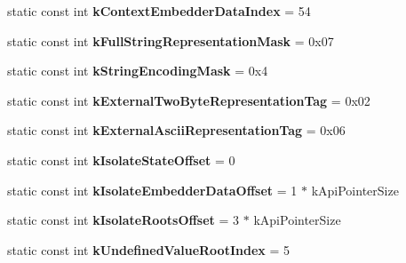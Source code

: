 \begin{DoxyCompactItemize}
\item 
\hypertarget{classv8_1_1internal_1_1_internals_afb65846499ec5f68172e4b2e8301a493}{}static const int {\bfseries k\+Context\+Embedder\+Data\+Index} = 54\label{classv8_1_1internal_1_1_internals_afb65846499ec5f68172e4b2e8301a493}

\item 
\hypertarget{classv8_1_1internal_1_1_internals_a5c39a86b30463928ea719def66916507}{}static const int {\bfseries k\+Full\+String\+Representation\+Mask} = 0x07\label{classv8_1_1internal_1_1_internals_a5c39a86b30463928ea719def66916507}

\item 
\hypertarget{classv8_1_1internal_1_1_internals_a1927ac3def13a57e03025e62ca46d1c5}{}static const int {\bfseries k\+String\+Encoding\+Mask} = 0x4\label{classv8_1_1internal_1_1_internals_a1927ac3def13a57e03025e62ca46d1c5}

\item 
\hypertarget{classv8_1_1internal_1_1_internals_a73faf917416d2519b65c7255e77a74ce}{}static const int {\bfseries k\+External\+Two\+Byte\+Representation\+Tag} = 0x02\label{classv8_1_1internal_1_1_internals_a73faf917416d2519b65c7255e77a74ce}

\item 
\hypertarget{classv8_1_1internal_1_1_internals_adea2f5a76d07821f7fa885a8dcda0eec}{}static const int {\bfseries k\+External\+Ascii\+Representation\+Tag} = 0x06\label{classv8_1_1internal_1_1_internals_adea2f5a76d07821f7fa885a8dcda0eec}

\item 
\hypertarget{classv8_1_1internal_1_1_internals_af591f991ecb24f9f6b33209e33b0d9ef}{}static const int {\bfseries k\+Isolate\+State\+Offset} = 0\label{classv8_1_1internal_1_1_internals_af591f991ecb24f9f6b33209e33b0d9ef}

\item 
\hypertarget{classv8_1_1internal_1_1_internals_ad722bf4760df09958cd1062db4a5524c}{}static const int {\bfseries k\+Isolate\+Embedder\+Data\+Offset} = 1 $\ast$ k\+Api\+Pointer\+Size\label{classv8_1_1internal_1_1_internals_ad722bf4760df09958cd1062db4a5524c}

\item 
\hypertarget{classv8_1_1internal_1_1_internals_a3142f942a25203ce7fca0e9a4563c74d}{}static const int {\bfseries k\+Isolate\+Roots\+Offset} = 3 $\ast$ k\+Api\+Pointer\+Size\label{classv8_1_1internal_1_1_internals_a3142f942a25203ce7fca0e9a4563c74d}

\item 
\hypertarget{classv8_1_1internal_1_1_internals_a7281ff0eafed559e64613465b1a03296}{}static const int {\bfseries k\+Undefined\+Value\+Root\+Index} = 5\label{classv8_1_1internal_1_1_internals_a7281ff0eafed559e64613465b1a03296}


\end{DoxyCompactItemize}
